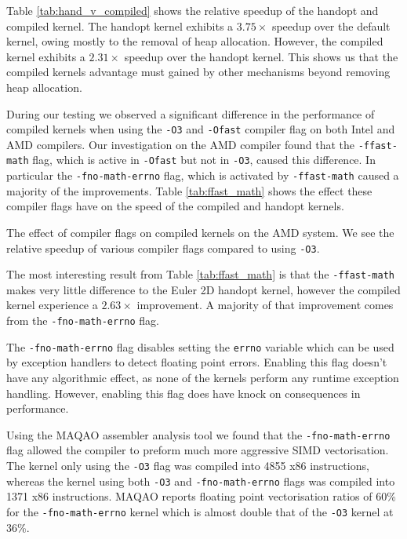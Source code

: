 Table \ref{tab:hand_v_compiled} shows the relative speedup of the handopt and compiled kernel.
The handopt kernel exhibits a $3.75\times$ speedup over the default kernel, owing mostly to the removal of heap allocation.
However, the compiled kernel exhibits a $2.31\times$ speedup over the handopt kernel.
This shows us that the compiled kernels advantage must gained by other mechanisms beyond removing heap allocation.

During our testing we observed a significant difference in the performance of compiled kernels when using the \texttt{-O3} and \texttt{-Ofast} compiler flag on both Intel and AMD compilers.
Our investigation on the AMD compiler found that the \texttt{-ffast-math} flag, which is active in \texttt{-Ofast} but not in \texttt{-O3}, caused this difference.
In particular the \texttt{-fno-math-errno} flag, which is activated by \texttt{-ffast-math} caused a majority of the improvements.
Table \ref{tab:ffast_math} shows the effect these compiler flags have on the speed of the compiled and handopt kernels.

\begin{table}
    \centering
 
\caption{The effect of compiler flags on compiled kernels on the AMD system. We see the relative speedup of various compiler flags compared to using \texttt{-O3}.}\label{tab:ffast_math} 
\end{table}

The most interesting result from Table \ref{tab:ffast_math} is that the \texttt{-ffast-math} makes very little difference to the Euler 2D handopt kernel, however the compiled kernel experience a $2.63\times$ improvement.
A majority of that improvement comes from the \texttt{-fno-math-errno} flag.

The \texttt{-fno-math-errno} flag disables setting the \texttt{errno} variable which can be used by exception handlers to detect floating point errors.
Enabling this flag doesn't have any algorithmic effect, as none of the kernels perform any runtime exception handling.
However, enabling this flag does have knock on consequences in performance.

Using the MAQAO assembler analysis tool \cite{MAQAO} we found that the \texttt{-fno-math-errno} flag allowed the compiler to preform much more aggressive SIMD vectorisation.
The kernel only using the \texttt{-O3} flag was compiled into 4855 x86 instructions, whereas the kernel using both \texttt{-O3} and \texttt{-fno-math-errno} flags was compiled into 1371 x86 instructions.
MAQAO reports floating point vectorisation ratios of 60\% for the \texttt{-fno-math-errno} kernel which is almost double that of the \texttt{-O3} kernel at 36\%.

